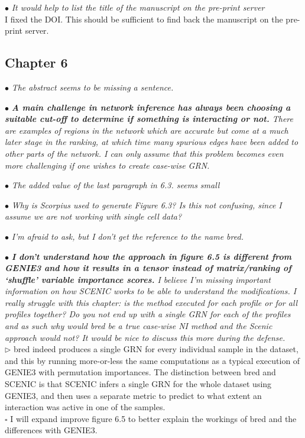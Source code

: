 \documentclass[10pt]{article}
\newcommand{\todo}{$\square$}
\newcommand{\done}{\makebox[0pt][l]{$\square$}\raisebox{.15ex}{\hspace{0.1em}$\checkmark$}}%
\newcommand{\exam}[2][\  ]{\hspace{0pt}\marginpar{\color{myred}#1}$\bullet$ \textit{#2}}
\newcommand{\imp}[1]{\textbf{#1}}
\newcommand{\answ}[1]{{\color{myblue} $\triangleright$ #1}}
\newcommand{\task}[2][\todo]{{\color{myblue} #1 #2}}
\begin{document}
\exam{It would help to list the title of the manuscript on the pre-print server} \\
\task[\done]{I fixed the DOI. This should be sufficient to find back the manuscript on the pre-print server.}


\subsection{Chapter 6}

\exam{The abstract seems to be missing a sentence.}


\exam{\imp{A main challenge in network inference has always been choosing a suitable
		cut-off to determine if something is interacting or not.} There are examples of
		regions in the network which are accurate but come at a much later stage in
		the ranking, at which time many spurious edges have been added to other
		parts of the network. I can only assume that this problem becomes even more
		challenging if one wishes to create case-wise GRN.}
	

\exam{The added value of the last paragraph in 6.3. seems small}

\exam{Why is Scorpius used to generate Figure 6.3? Is this not confusing, since I
		assume we are not working with single cell data?}

\exam{I’m afraid to ask, but I don’t get the reference to the name bred.}


\exam{\imp{I don’t understand how the approach in figure 6.5 is different from GENIE3 and
		how it results in a tensor instead of matrix/ranking of ‘shuffle’ variable
		importance scores.} I believe I’m missing important information on how
		SCENIC works to be able to understand the modifications. I really struggle
		with this chapter: is the method executed for each profile or for all profiles
		together? Do you not end up with a single GRN for each of the profiles and as
		such why would bred be a true case-wise NI method and the Scenic approach
		would not? It would be nice to discuss this more during the defense.} \\
\answ{bred indeed produces a single GRN for every individual sample in the dataset, and this by running more-or-less the same computations as a typical execution of GENIE3 with permutation importances. The distinction between bred and SCENIC is that SCENIC infers a single GRN for the whole dataset using GENIE3, and then uses a separate metric to predict to what extent an interaction was active in one of the samples.} \\
\task{I will expand improve figure 6.5 to better explain the workings of bred and the differences with GENIE3.}
\end{document}
